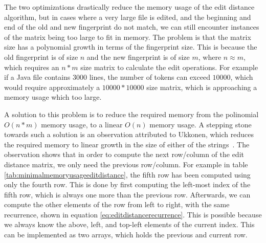 The two optimizations drastically reduce the memory usage of the edit distance algorithm,
but in cases where a very large file is edited, and the beginning and end of the old and
new fingerprint do not match, we can still encounter instances of the matrix being too
large to fit in memory. The problem is that the matrix size has a polynomial growth in
terms of the fingerprint size. This is because the old fingerprint is of size $n$ and the
new fingerprint is of size $m$, where $n \approx m$, which requires an $n * m$ size matrix
to calculate the edit operations. For example if a Java file contains $3000$ lines, the
number of tokens can exceed $10000$, which would require approximately a $10000 * 10000$
size matrix, which is approaching a memory usage which too large.

A solution to this problem is to reduce the required memory from the polinomial $O(n*m)$
memory usage, to a linear $O(n)$ memory usage. A stepping stone towards such a solution is
an observation attributed to Ukkonen, which reduces the required memory to linear growth
in the size of either of the strings~\cite{UkkonenEditDistance}. The observation shows
that in order to compute the next row/column of the edit distance matrix, we only need the
previous row/column. For example in table \ref{tab:minimalmemoryusageeditdistance}, the
fifth row has been computed using only the fourth row. This is done by first computing the
left-most index of the fifth row, which is always one more than the previous row.
Afterwards, we can compute the other elements of the row from left to right, with the same
recurrence, shown in equation \ref{eq:editdistancerecurrence}. This is possible because we
always know the above, left, and top-left elements of the current index. This can be
implemented as two arrays, which holds the previous and current row. 

